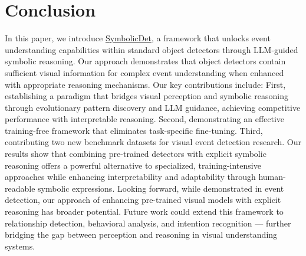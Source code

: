 \section{Conclusion}
\label{con}
% 
% 
In this paper, we introduce \underline{SymbolicDet}, a framework that unlocks event understanding capabilities within standard object detectors through LLM-guided symbolic reasoning. Our approach demonstrates that object detectors contain sufficient visual information for complex event understanding when enhanced with appropriate reasoning mechanisms.
Our key contributions include: First, establishing a paradigm that bridges visual perception and symbolic reasoning through evolutionary pattern discovery and LLM guidance, achieving competitive performance with interpretable reasoning. Second, demonstrating an effective training-free framework that eliminates task-specific fine-tuning. Third, contributing two new benchmark datasets for visual event detection research.
Our results show that combining pre-trained detectors with explicit symbolic reasoning offers a powerful alternative to specialized, training-intensive approaches while enhancing interpretability and adaptability through human-readable symbolic expressions.
Looking forward, while demonstrated in event detection, our approach of enhancing pre-trained visual models with explicit reasoning has broader potential. Future work could extend this framework to relationship detection, behavioral analysis, and intention recognition --- further bridging the gap between perception and reasoning in visual understanding systems.
